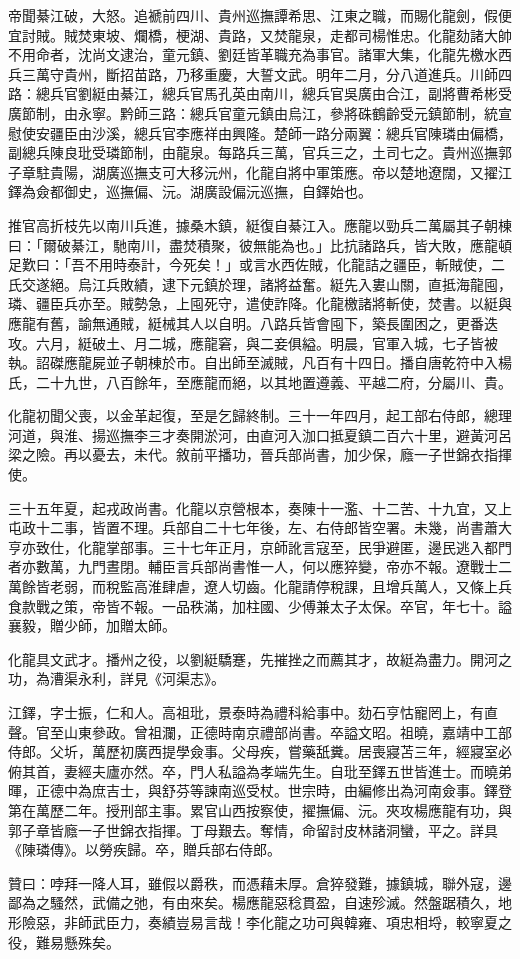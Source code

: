 \begin{pinyinscope}
帝聞綦江破，大怒。追褫前四川、貴州巡撫譚希思、江東之職，而賜化龍劍，假便宜討賊。賊焚東坡、爛橋，梗湖、貴路，又焚龍泉，走都司楊惟忠。化龍劾諸大帥不用命者，沈尚文逮治，童元鎮、劉廷皆革職充為事官。諸軍大集，化龍先檄水西兵三萬守貴州，斷招苗路，乃移重慶，大誓文武。明年二月，分八道進兵。川師四路：總兵官劉綎由綦江，總兵官馬孔英由南川，總兵官吳廣由合江，副將曹希彬受廣節制，由永寧。黔師三路：總兵官童元鎮由烏江，參將硃鶴齡受元鎮節制，統宣慰使安疆臣由沙溪，總兵官李應祥由興隆。楚師一路分兩翼：總兵官陳璘由偏橋，副總兵陳良玭受璘節制，由龍泉。每路兵三萬，官兵三之，土司七之。貴州巡撫郭子章駐貴陽，湖廣巡撫支可大移沅州，化龍自將中軍策應。帝以楚地遼闊，又擢江鐸為僉都御史，巡撫偏、沅。湖廣設偏沅巡撫，自鐸始也。

推官高折枝先以南川兵進，據桑木鎮，綎復自綦江入。應龍以勁兵二萬屬其子朝棟曰：「爾破綦江，馳南川，盡焚積聚，彼無能為也。」比抗諸路兵，皆大敗，應龍頓足歎曰：「吾不用時泰計，今死矣！」或言水西佐賊，化龍詰之疆臣，斬賊使，二氏交遂絕。烏江兵敗績，逮下元鎮於理，諸將益奮。綎先入婁山關，直抵海龍囤，璘、疆臣兵亦至。賊勢急，上囤死守，遣使詐降。化龍檄諸將斬使，焚書。以綎與應龍有舊，諭無通賊，綎械其人以自明。八路兵皆會囤下，築長圍困之，更番迭攻。六月，綎破土、月二城，應龍窘，與二妾俱縊。明晨，官軍入城，七子皆被執。詔磔應龍屍並子朝棟於市。自出師至滅賊，凡百有十四日。播自唐乾符中入楊氏，二十九世，八百餘年，至應龍而絕，以其地置遵義、平越二府，分屬川、貴。

化龍初聞父喪，以金革起復，至是乞歸終制。三十一年四月，起工部右侍郎，總理河道，與淮、揚巡撫李三才奏開淤河，由直河入泇口抵夏鎮二百六十里，避黃河呂梁之險。再以憂去，未代。敘前平播功，晉兵部尚書，加少保，廕一子世錦衣指揮使。

三十五年夏，起戎政尚書。化龍以京營根本，奏陳十一濫、十二苦、十九宜，又上屯政十二事，皆置不理。兵部自二十七年後，左、右侍郎皆空署。未幾，尚書蕭大亨亦致仕，化龍掌部事。三十七年正月，京師訛言寇至，民爭避匿，邊民逃入都門者亦數萬，九門晝閉。輔臣言兵部尚書惟一人，何以應猝變，帝亦不報。遼戰士二萬餘皆老弱，而稅監高淮肆虐，遼人切齒。化龍請停稅課，且增兵萬人，又條上兵食款戰之策，帝皆不報。一品秩滿，加柱國、少傅兼太子太保。卒官，年七十。謚襄毅，贈少師，加贈太師。

化龍具文武才。播州之役，以劉綎驕蹇，先摧挫之而薦其才，故綎為盡力。開河之功，為漕渠永利，詳見《河渠志》。

江鐸，字士振，仁和人。高祖玭，景泰時為禮科給事中。劾石亨怙寵罔上，有直聲。官至山東參政。曾祖瀾，正德時南京禮部尚書。卒謚文昭。祖曉，嘉靖中工部侍郎。父圻，萬歷初廣西提學僉事。父母疾，嘗藥舐糞。居喪寢苫三年，經寢室必俯其首，妻經夫廬亦然。卒，門人私謚為孝端先生。自玭至鐸五世皆進士。而曉弟暉，正德中為庶吉士，與舒芬等諫南巡受杖。世宗時，由編修出為河南僉事。鐸登第在萬歷二年。授刑部主事。累官山西按察使，擢撫偏、沅。夾攻楊應龍有功，與郭子章皆廕一子世錦衣指揮。丁母艱去。奪情，命留討皮林諸洞蠻，平之。詳具《陳璘傳》。以勞疾歸。卒，贈兵部右侍郎。

贊曰：哱拜一降人耳，雖假以爵秩，而憑藉未厚。倉猝發難，據鎮城，聯外寇，邊鄙為之騷然，武備之弛，有由來矣。楊應龍惡稔貫盈，自速殄滅。然盤踞積久，地形險惡，非師武臣力，奏績豈易言哉！李化龍之功可與韓雍、項忠相埒，較寧夏之役，難易懸殊矣。


\end{pinyinscope}